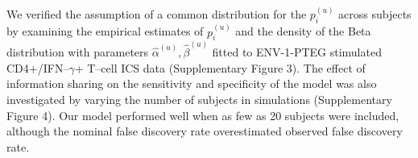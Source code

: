 \documentclass[12pt,oupdraft]{biostatistics}
\begin{document}

We verified the assumption of a common distribution for the $p^{(u)}_{i}$
across subjects by examining the empirical estimates of $p^{(u)}_{i}$ and the
density of the Beta distribution with parameters $\hat{\alpha}^{(u)},
\hat{\beta}^{(u)}$ fitted to ENV-1-PTEG stimulated
CD4+/IFN--$\gamma$+ T--cell ICS data (Supplementary Figure 3). The effect of information sharing on the sensitivity and specificity of the model was also investigated by varying the number of subjects in simulations (Supplementary Figure 4). Our model performed well when as few as 20 subjects were included, although the nominal false discovery rate overestimated observed false discovery rate.
\end{document}

